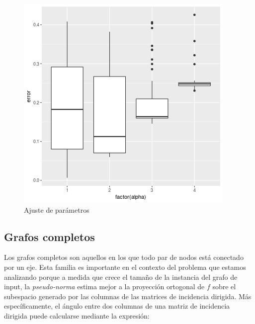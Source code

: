 \documentclass[10pt, a4paper, twocolumn]{article} %
\begin{document}

\begin{figure}
	\includegraphics[width=\linewidth]{calibrate_complete_beta10_iter20000_tests50.png} %
	\caption{Ajuste de parámetros} %
	\label{fig:ajuste2} %
\end{figure}

\newpage

\subsection{Grafos completos}

Los grafos completos son aquellos en los que todo par de nodos está 
conectado por un eje. Esta familia es importante en el contexto del 
problema que estamos analizando porque a medida que crece el tamaño de 
la instancia del grafo de input, la \emph{pseudo-norma} estima mejor a 
la proyección ortogonal de $f$ sobre el subespacio generado por las 
columnas de las matrices de incidencia dirigida. Más específicamente, 
el ángulo entre dos columnas de una matriz de incidencia dirigida puede 
calcularse mediante la expresión:
\end{document}
